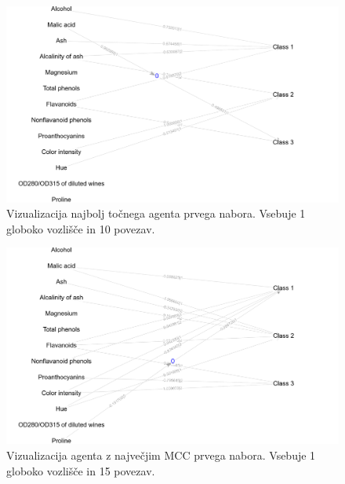 \begin{figure}[H]
    \begin{center}
        \includegraphics[width=13cm]{wine/1/acc_g}
    \end{center}
    \caption{Vizualizacija najbolj točnega agenta prvega nabora. Vsebuje 1 globoko vozlišče in 10 povezav.}
    \label{fig:wine_acc_1_g}
\end{figure}

\begin{figure}[H]
    \begin{center}
        \includegraphics[width=13cm]{wine/1/mcc_g}
    \end{center}
    \caption{Vizualizacija agenta z največjim MCC prvega nabora. Vsebuje 1 globoko vozlišče in 15 povezav.}
    \label{fig:wine_mcc_1_g}
\end{figure}


